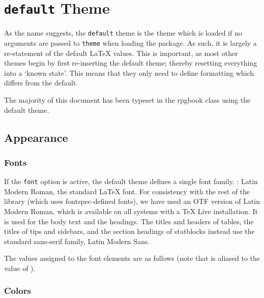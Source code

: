 \chapter{\texttt{default} Theme}\label{Theme:Default}

	As the name suggests, the \texttt{default} theme is the theme which is loaded if no arguments are passed to \texttt{theme} when loading the \rpgtex{} package. As such, it is largely a re-statement of the default \LaTeX{} values. This is important, as most other themes begin by first re-inserting the default theme; thereby resetting everything into a `known state'. This means that they only need to define formatting which differs from the default.

	The majority of this document has been typeset in the rpgbook class  using the default theme.

	\section{Appearance}
		\subsection{Fonts}
			If the \texttt{font} option is active, the default theme defines a single font family, : Latin Modern Roman, the standard \LaTeX{} font. For consistency with the rest of the library (which uses fontspec-defined fonts), we have used an OTF version of Latin Modern Roman, which is available on all systems with a TeX Live installation. It is used for the body text and the headings. The titles and headers of tables, the titles of tips and sidebars, and the section headings of statblocks instead use the standard sans-serif family, Latin Modern Sans.


			The values assigned to the font elements are as follows (note that  is aliased to the value of ).

			\InsertFontTable{}

		\subsection{Colors}

